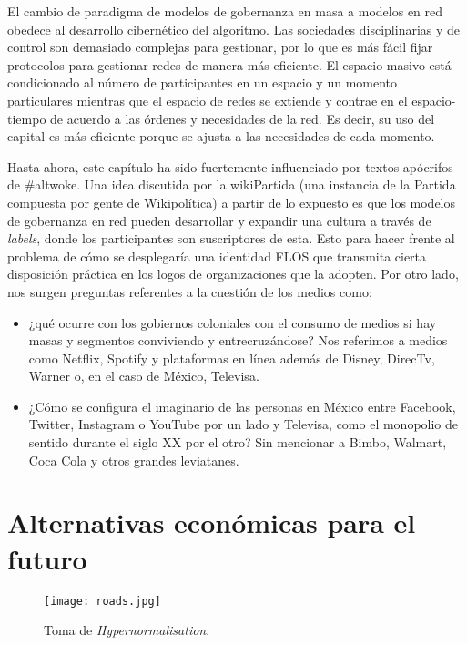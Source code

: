 El cambio de paradigma de modelos de gobernanza en masa a modelos en red obedece al desarrollo cibernético del algoritmo. Las sociedades disciplinarias y de control son demasiado complejas para gestionar, por lo que es más fácil fijar protocolos para gestionar redes de manera más eficiente. El espacio masivo está condicionado al número de participantes en un espacio y un momento particulares mientras que el espacio de redes se extiende y contrae en el espacio-tiempo de acuerdo a las órdenes y necesidades de la red. Es decir, su uso del capital es más eficiente porque se ajusta a las necesidades de cada momento.

Hasta ahora, este capítulo ha sido fuertemente influenciado por textos apócrifos de \#altwoke. Una idea discutida por la wikiPartida (una instancia de la Partida compuesta por gente de Wikipolítica) a partir de lo expuesto es que los modelos de gobernanza en red pueden desarrollar y expandir una cultura a través de \emph{labels}, donde los participantes son suscriptores de esta. Esto para hacer frente al problema de cómo se desplegaría una identidad FLOS que transmita cierta disposición práctica en los logos de organizaciones que la adopten. Por otro lado, nos surgen preguntas referentes a la cuestión de los medios como:

\begin{itemize}
	\item ¿qué ocurre con los gobiernos coloniales con el consumo de medios si hay masas y segmentos conviviendo y entrecruzándose? Nos referimos a medios como Netflix, Spotify y plataformas en línea además de Disney, DirecTv, Warner o, en el caso de México, Televisa.
	\item ¿Cómo se configura el imaginario de las personas en México entre Facebook, Twitter, Instagram o YouTube por un lado y Televisa, como el monopolio de sentido durante el siglo XX por el otro? Sin mencionar a Bimbo, Walmart, Coca Cola y otros grandes leviatanes.
\end{itemize}

\section{Alternativas económicas para el futuro}
\label{sec:altfutur}

\begin{figure}[htbp]
	\centering
	\texttt{[image: roads.jpg]}
	\caption[\emph{Hypernormalisation}]{Toma de \emph{Hypernormalisation}.}
	\label{fig:hypernormalisation2}
\end{figure}

